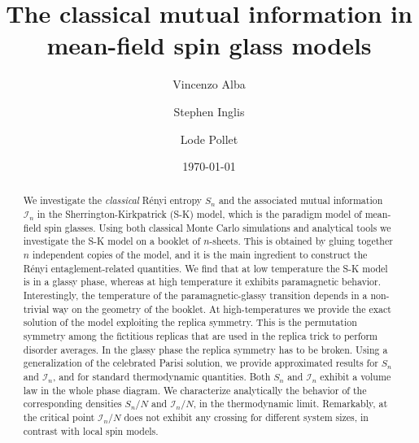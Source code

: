 \documentclass[twocolumn,superscriptaddress,prb,10pt]{revtex4-1}
\begin{document}
\title{The classical mutual information in mean-field spin glass models} 

\author{Vincenzo Alba}
\author{Stephen Inglis}
\author{Lode Pollet}

\date{\today}




\begin{abstract} 

We investigate the \emph{classical} R\'enyi entropy $S_n$ and the associated mutual 
information ${\mathcal I}_n$ in the Sherrington-Kirkpatrick (S-K) model, which is the 
paradigm model of mean-field spin glasses. 
Using both classical Monte Carlo simulations and analytical tools we investigate the 
S-K model on a booklet of $n$-sheets.
This is obtained by gluing together $n$ independent copies of the model, and it is the 
main ingredient to construct the R\'enyi entaglement-related quantities. We find that at 
low temperature the S-K model is in a glassy phase, whereas at high temperature it exhibits 
paramagnetic behavior. Interestingly, the temperature of the paramagnetic-glassy 
transition depends in a non-trivial way on the geometry of the booklet. At high-temperatures 
we provide the exact solution of the model exploiting the replica symmetry. This is the 
permutation symmetry among the fictitious replicas that are used in the replica trick to 
perform disorder averages. In the glassy phase the replica symmetry has to be broken. 
Using a generalization of the celebrated Parisi solution, we provide approximated results 
for $S_n$ and ${\mathcal I}_n$, and for standard thermodynamic quantities. Both $S_n$ 
and ${\mathcal I}_n$ exhibit a volume law in the whole phase diagram. We characterize 
analytically the behavior of the corresponding densities $S_n/N$ and ${\mathcal I}_n/N$, 
in the thermodynamic limit. Remarkably, at the critical point ${\mathcal I}_n/N$ does not 
exhibit any crossing for different system sizes, in contrast with local spin models. 

\end{abstract}
\end{document}
